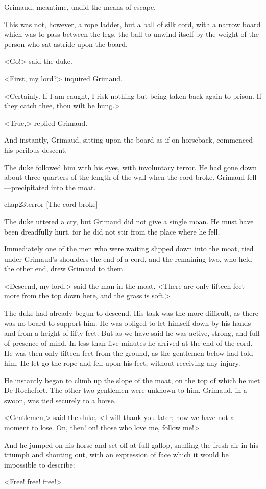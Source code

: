 Grimaud, meantime, undid the means of escape.

This was not, however, a rope ladder, but a ball of silk cord, with a narrow board which was to pass between the legs, the ball to unwind itself by the weight of the person who sat astride upon the board.

<Go!> said the duke.

<First, my lord?> inquired Grimaud.

<Certainly. If I am caught, I risk nothing but being taken back again to prison. If they catch thee, thou wilt be hung.>

<True,> replied Grimaud.

And instantly, Grimaud, sitting upon the board as if on horseback, commenced his perilous descent.

The duke followed him with his eyes, with involuntary terror. He had gone down about three-quarters of the length of the wall when the cord broke. Grimaud fell—precipitated into the moat.

\begin{bwbigpic}
	[\basicscale] 
	{chap23terror}
	[The cord broke]
\end{bwbigpic}

The duke uttered a cry, but Grimaud did not give a single moan. He must have been dreadfully hurt, for he did not stir from the place where he fell.

Immediately one of the men who were waiting slipped down into the moat, tied under Grimaud's shoulders the end of a cord, and the remaining two, who held the other end, drew Grimaud to them.

<Descend, my lord,> said the man in the moat. <There are only fifteen feet more from the top down here, and the grass is soft.>

The duke had already begun to descend. His task was the more difficult, as there was no board to support him. He was obliged to let himself down by his hands and from a height of fifty feet. But as we have said he was active, strong, and full of presence of mind. In less than five minutes he arrived at the end of the cord. He was then only fifteen feet from the ground, as the gentlemen below had told him. He let go the rope and fell upon his feet, without receiving any injury.

He instantly began to climb up the slope of the moat, on the top of which he met De Rochefort. The other two gentlemen were unknown to him. Grimaud, in a swoon, was tied securely to a horse.

<Gentlemen,> said the duke, <I will thank you later; now we have not a moment to lose. On, then! on! those who love me, follow me!>

And he jumped on his horse and set off at full gallop, snuffing the fresh air in his triumph and shouting out, with an expression of face which it would be impossible to describe:

<Free! free! free!> 